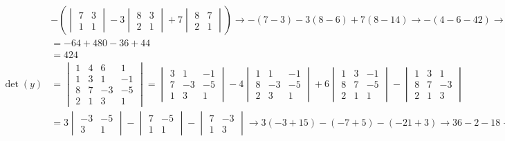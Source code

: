 \documentclass[
  letterpaper,
  DIV=11,
  numbers=noendperiod]{scrartcl}
\begin{document}
\begin{align*}
&-\left(\begin{vmatrix}7 & 3 \\ 1 & 1\end{vmatrix}-3\begin{vmatrix} 8 & 3 \\ 2 & 1 \end{vmatrix} +7\begin{vmatrix}8 & 7 \\ 2 & 1 \end{vmatrix}\right) \rightarrow -(7-3)-3(8-6)+7(8-14) \rightarrow -(4-6-42) \rightarrow 44 \\
&= -64+480-36+44 \\
&= 424 \\
\det{(y)} &= \begin{vmatrix}1 & 4 & 6 & 1 \\ 1 & 3 & 1 & -1 \\ 8 & 7 & -3 & -5 \\ 2 & 1 & 3 & 1 \end{vmatrix} = \begin{vmatrix}3 & 1 & -1 \\ 7 & -3 & -5 \\ 1 & 3 & 1 \end{vmatrix}-4\begin{vmatrix}1 & 1 & -1 \\ 8 & -3 & -5 \\ 2 & 3 & 1 \end{vmatrix}+6\begin{vmatrix}1 & 3 & -1 \\ 8 & 7 & -5 \\ 2 & 1 & 1 \end{vmatrix}-\begin{vmatrix}1 & 3 & 1 \\ 8 & 7 & -3 \\ 2 & 1 & 3 \end{vmatrix} \\
&= 3\begin{vmatrix}-3 & -5 \\ 3 & 1 \end{vmatrix}-\begin{vmatrix}7 & -5 \\ 1 & 1 \end{vmatrix}-\begin{vmatrix} 7 & -3 \\ 1 & 3 \end{vmatrix} \rightarrow 3(-3+15)-(-7+5)-(-21+3) \rightarrow 36-2-18 \rightarrow 16 \\

\end{align*}
\end{document}
